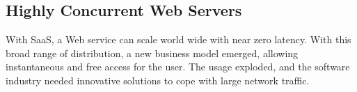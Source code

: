 





\subsection{Highly Concurrent Web Servers}

With SaaS, a Web service can scale world wide with near zero latency. %
With this broad range of distribution, a new business model emerged, allowing instantaneous and free access for the user.
The usage exploded, and the software industry needed innovative solutions to cope with large network traffic.

